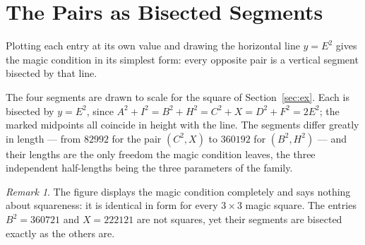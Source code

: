 \documentclass[12pt]{article}
\theoremstyle{remark}
\newtheorem{remark}[theorem]{Remark}
\begin{document}
\section{The Pairs as Bisected Segments}

Plotting each entry at its own value and drawing the horizontal line
$y = E^2$ gives the magic condition in its simplest form: every
opposite pair is a vertical segment bisected by that line.

\begin{center}
\end{center}

The four segments are drawn to scale for the square of
Section~\ref{sec:ex}. Each is bisected by $y = E^2$, since
$A^2 + I^2 = B^2 + H^2 = C^2 + X = D^2 + F^2 = 2E^2$; the marked
midpoints all coincide in height with the line. The segments differ
greatly in length --- from $82992$ for the pair $(C^2, X)$ to $360192$
for $(B^2, H^2)$ --- and their lengths are the only freedom the magic
condition leaves, the three independent half-lengths being the three
parameters of the family.

\begin{remark}
The figure displays the magic condition completely and says nothing
about squareness: it is identical in form for every $3\times3$ magic
square. The entries $B^2 = 360721$ and $X = 222121$ are not squares,
yet their segments are bisected exactly as the others are.
\end{remark}
\end{document}
